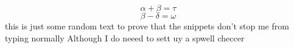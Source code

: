 \documentclass[12pt]{article}
\begin{document}
\begin{equation}
  \alpha + \beta = \tau
\end{equation}
\begin{equation}
  \beta - \delta = \omega
  \label{eq:isn't this cool}
\end{equation}
this is just some random text to prove that the snippets don't stop me from typing normally
Although I do neeed to sett uy a spwell checcer
\end{document}
